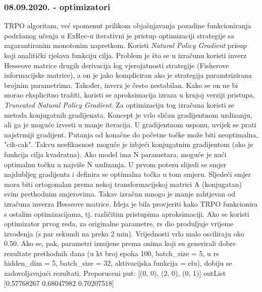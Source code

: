 \subsubsection{08.09.2020. - optimizatori}
TRPO algoritam, već spomenut prilikom objašnjavanja pozadine funkcioniranja podržanog učenja u ExRec-u iterativni je pristup optimizaciji strategije sa zagarantiranim monotonim napretkom.\newline
Koristi \textit{Natural Policy Gradient} prisup koji analitički rješava funkciju cilja. Problem je što se u izračunu koristi inverz Hesseove matrice drugih derivacija log vjerojatnosti strategije (Fisherove informacijske matrice), a on je jako kompliciran ako je strategija paramtrizirana brojnim parametrima. Također, inverz je često nestabilan. Kako se on ne bi morao eksplicitno tražiti, koristi se aproksimacija izraza u krnjoj verziji pristupa, \textit{Truncated Natural Policy Gradient}. Za optimizaciju tog izračuna koristi se metoda konjugatnih gradijenata. \newline
Koncept je vrlo sličan gradijentnom uzdizanju, ali ga je moguće izvesti u manje iteracija. U gradijentnom usponu, uvijek se prati najstrmiji gradijent. Putanja od konačne do početne točke može biti neoptimalna, "cik-cak". Takvu neefikasnost moguće je izbjeći konjugatnim gradijentom (ako je funkcija cilja kvadratna). Ako model ima N parametara, moguće je naći optimalnu točku u najviše N uzdizanja. U prvom potezu slijedi se smjer najdubljeg gradijenta i definira se optimalna točka u tom smjeru. Sljedeći smjer mora biti ortogonalan prema nekoj transformacijskoj matrici A (konjugatan) svim prethodnim smjerovima. Takav izračun mnogo je manje zahtjevan od izračuna inverza Hesseove matrice.\newline
Ideja je bila provjeriti kako TRPO funkcionira s ostalim optimizacijama, tj. različitim pristupima aproksimaciji. \newline
Ako se koristi optimizator prvog reda, za originalne parametre, rs dio produljuje vrijeme izvođenja (s par sekundi na preko 2 min). Vrijednosti vrlo malo osciliraju oko 0.50. 
Ako se, pak, parametri izmijene prema onima koji su generirali dobre rezultate prethodnih dana (u kt broj epoha 100, batch\_size = 5, u rs hidden\_dim = 5, batch\_size = 32, aktivacijska funkcija = elu), dobiju se zadovoljavajući rezultati.\newline
Preporuceni put: [(0, 0), (2, 0), (0, 1)]\newline
outList [0.57768267 0.68047982 0.70207518]\newline
